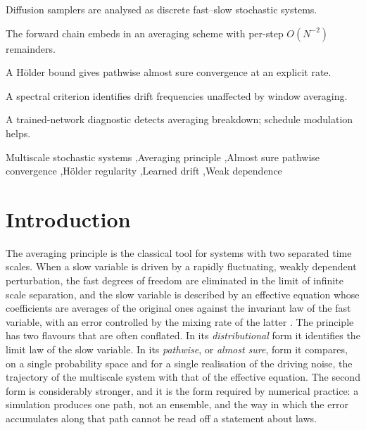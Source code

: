 \documentclass[a4paper,fleqn]{cas-dc}
\theoremstyle{definition}
\begin{document}
\begin{highlights}
\item Diffusion samplers are analysed as discrete fast--slow stochastic systems.
\item The forward chain embeds in an averaging scheme with per-step $O(N^{-2})$ remainders.
\item A H\"older bound gives pathwise almost sure convergence at an explicit rate.
\item A spectral criterion identifies drift frequencies unaffected by window averaging.
\item A trained-network diagnostic detects averaging breakdown; schedule modulation helps.
\end{highlights}

\begin{keywords}
Multiscale stochastic systems \sep Averaging principle \sep Almost sure pathwise
convergence \sep H\"older regularity \sep Learned drift \sep Weak dependence
\end{keywords}

\maketitle

\section{Introduction}
\label{sec:intro}

The averaging principle is the classical tool for systems with two separated time
scales. When a slow variable is driven by a rapidly fluctuating, weakly dependent
perturbation, the fast degrees of freedom are eliminated in the limit of infinite
scale separation, and the slow variable is described by an effective equation whose
coefficients are averages of the original ones against the invariant law of the fast
variable, with an error controlled by the mixing rate of the latter
\citep{bogoliubov1961,khasminskii1966,papanicolaou1977,bensoussan1978,freidlin2012,
pavliotis2008,givon2004,dolgopyat2004}. The principle has two flavours that are often
conflated. In its \emph{distributional} form it identifies the limit law of the slow
variable. In its \emph{pathwise}, or \emph{almost sure}, form it compares, on a single
probability space and for a single realisation of the driving noise, the trajectory of
the multiscale system with that of the effective equation. The second form is
considerably stronger, and it is the form required by numerical practice: a simulation
produces one path, not an ensemble, and the way in which the error accumulates along
that path cannot be read off a statement about laws.
\end{document}
